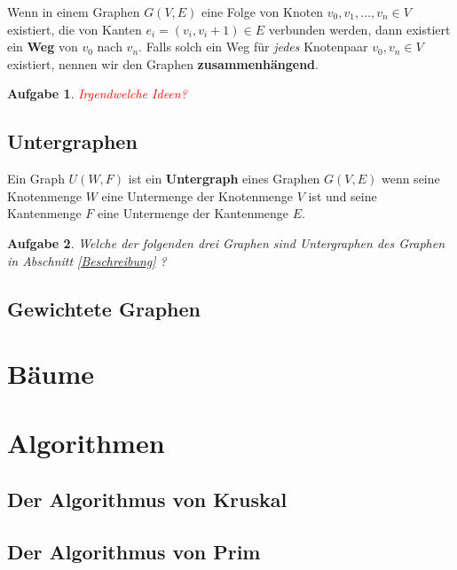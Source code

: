 \documentclass[12pt,a4paper]{report}
\theoremstyle{break}
\newtheorem{exercise}{Aufgabe}[section]
\begin{document}
Wenn in einem Graphen $G(V,E)$ eine Folge von Knoten $v_0, v_1,
\ldots, v_n \in V$ existiert, die von Kanten $e_i = (v_i, v_i+1) \in
E$ verbunden werden, dann existiert ein \textbf{Weg} von $v_0$ nach
$v_n$. Falls solch ein Weg f\"{u}r \emph{jedes} Knotenpaar $v_0, v_n
\in V$ existiert, nennen wir den Graphen \textbf{zusammenh\"{a}ngend}.

\begin{exercise}
\textcolor{red}{Irgendwelche Ideen?}
\end{exercise}

\section{Untergraphen}

Ein Graph $U(W,F)$ ist ein \textbf{Untergraph} eines Graphen $G(V,E)$
wenn seine Knotenmenge $W$ eine Untermenge der Knotenmenge $V$ ist und
seine Kantenmenge $F$ eine Untermenge der Kantenmenge $E$.

\begin{exercise}
Welche der folgenden drei Graphen sind Untergraphen des Graphen in
Abschnitt \ref{Beschreibung} ?


\end{exercise}

\section{Gewichtete Graphen}

\chapter{B\"{a}ume}
\chapter{Algorithmen}
\section{Der Algorithmus von Kruskal}
\section{Der Algorithmus von Prim}
\end{document}
